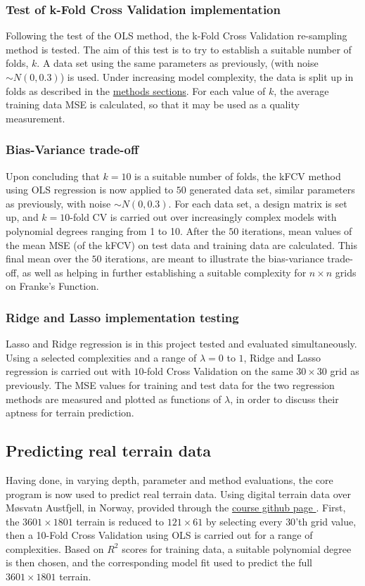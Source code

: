 \documentclass[%
oneside,                 %
final,                   %
10pt]{article}
\begin{document}
\subsubsection{Test of k-Fold Cross Validation implementation}
Following the test of the OLS method, the k-Fold Cross Validation re-sampling method is tested. The aim of this test is to try to establish a suitable number of folds, $k$. A data set using the same parameters as previously, (with noise $\sim N(0,0.3)$) is used. Under increasing model complexity, the data is split up in folds as described in the \hyperref[M:kfold]{methods sections}. For each value of $k$, the average training data MSE is calculated, so that it may be used as a quality measurement. 

\subsubsection{Bias-Variance trade-off}
Upon concluding that $k=10$ is a suitable number of folds, the kFCV method using OLS regression is now applied to $50$ generated data set, similar parameters as previously, with noise $\sim N(0,0.3)$. For each data set, a design matrix is set up, and $k=10$-fold CV is carried out over increasingly complex models with polynomial degrees ranging from 1 to 10. After the $50$ iterations, mean values of the mean MSE (of the kFCV) on test data and training data are calculated. This final mean over the $50$ iterations, are meant to illustrate the bias-variance trade-off, as well as helping in further establishing a suitable complexity for $n \times n$ grids on Franke's Function.

\subsubsection{Ridge and Lasso implementation testing}
Lasso and Ridge regression is in this project tested and evaluated simultaneously. Using a selected complexities and a range of $\lambda=0$ to $1$, Ridge and Lasso regression is carried out with $10$-fold Cross Validation on the same $30 \times 30$ grid as previously. The MSE values for training and test data for the two regression methods are measured and plotted as functions of $\lambda$, in order to discuss their aptness for terrain prediction.
\subsection{Predicting real terrain data}
Having done, in varying depth, parameter and method evaluations, the core program is now used to predict real terrain data. Using digital terrain data over Møsvatn Austfjell, in Norway, provided through the  \href{https://github.com/CompPhysics/MachineLearning/tree/master/doc/Projects/2019/Project1/DataFiles}{course github page }. First, the  $3601 \times 1801$ terrain is reduced to $121 \times 61$ by selecting every $30$'th grid value, then a 10-Fold Cross Validation using OLS is carried out for a range of complexities. Based on $R^2$ scores for training data, a suitable polynomial degree is then chosen, and the corresponding model fit used to predict the full $3601 \times 1801$ terrain.
\end{document}
